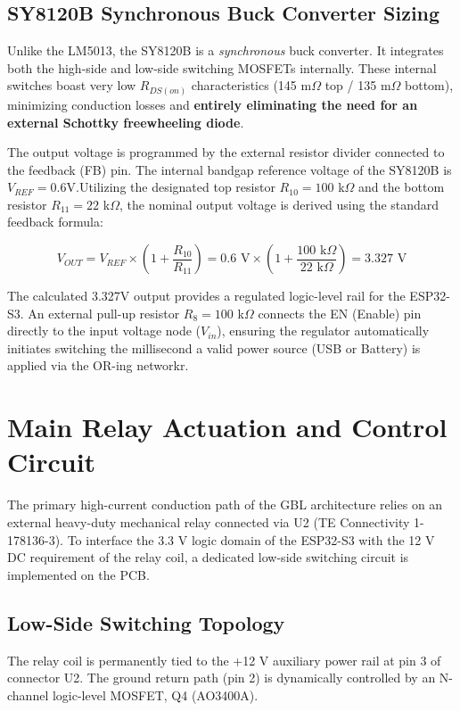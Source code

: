 \documentclass[11pt,a4paper]{article}
\begin{document}
\subsection{SY8120B Synchronous Buck Converter Sizing}

Unlike the LM5013, the SY8120B is a \textit{synchronous} buck converter. It integrates both the high-side and low-side switching MOSFETs internally. These internal switches boast very low $R_{DS(on)}$ characteristics (145 m$\Omega$ top / 135 m$\Omega$ bottom), minimizing conduction losses and \textbf{entirely eliminating the need for an external Schottky freewheeling diode}.

The output voltage is programmed by the external resistor divider connected to the feedback (FB) pin. The internal bandgap reference voltage of the SY8120B is $V_{REF} = 0.6$V.Utilizing the designated top resistor $R_{10} = 100$ k$\Omega$ and the bottom resistor $R_{11} = 22$ k$\Omega$, the nominal output voltage is derived using the standard feedback formula:

\begin{equation}
V_{OUT} = V_{REF} \times \left( 1 + \frac{R_{10}}{R_{11}} \right) = 0.6\text{ V} \times \left( 1 + \frac{100\text{ k}\Omega}{22\text{ k}\Omega} \right)= 3.327\text{ V} 
\end{equation}


The calculated 3.327V output provides a regulated logic-level rail for the ESP32-S3. An external pull-up resistor $R_8 = 100$ k$\Omega$ connects the EN (Enable) pin directly to the input voltage node ($V_{in}$), ensuring the regulator automatically initiates switching the millisecond a valid power source (USB or Battery) is applied via the OR-ing networkr.
\section{Main Relay Actuation and Control Circuit}
The primary high-current conduction path of the GBL architecture relies on an external heavy-duty mechanical relay connected via U2 (TE Connectivity 1-178136-3). To interface the 3.3 V logic domain of the ESP32-S3 with the 12 V DC requirement of the relay coil, a dedicated low-side switching circuit is implemented on the PCB.

\subsection{Low-Side Switching Topology}
The relay coil is permanently tied to the +12 V auxiliary power rail at pin 3 of connector U2. The ground return path (pin 2) is dynamically controlled by an N-channel logic-level MOSFET, Q4 (AO3400A).
\end{document}
